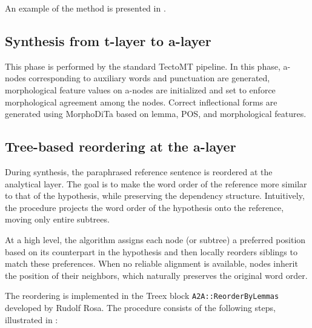 An example of the method is presented in .

\subsection{Synthesis from t-layer to a-layer}
\label{sect:treex:t2a}
This phase is performed by the standard TectoMT pipeline. In this phase, a-nodes corresponding to auxiliary words and punctuation are generated, morphological feature values on a-nodes are initialized and set to enforce morphological agreement among the nodes.  Correct inflectional forms are generated using MorphoDiTa based on lemma, POS, and morphological features.

\subsection{Tree-based reordering at the a-layer}
\label{sect:treex:reordering}

During synthesis, the paraphrased reference sentence is reordered at the analytical layer. The goal is to make the word order of the reference more similar to that of the hypothesis, while preserving the dependency structure. Intuitively, the procedure projects the word order of the hypothesis onto the reference, moving only entire subtrees.

At a high level, the algorithm assigns each node (or subtree) a preferred position based on its counterpart in the hypothesis and then locally reorders siblings to match these preferences. When no reliable alignment is available, nodes inherit the position of their neighbors, which naturally preserves the original word order.

The reordering is implemented in the Treex block \texttt{A2A::ReorderByLemmas}  developed by Rudolf Rosa. The procedure consists of the following steps, illustrated in :

